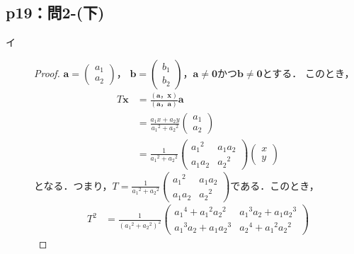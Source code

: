 \documentclass[uplatex,dvipdfmx,a4paper,10pt,fleqn]{jsarticle}
\begin{document}
\subsection*{p19：問2-(下)}
\begin{leftbar}
\begin{description}
    \item[イ] 
    \begin{proof}
    $\bm{a}=
        \begin{pmatrix}
            a_1 \\
            a_2
        \end{pmatrix}
    $，
    $\bm{b}=
        \begin{pmatrix}
            b_1 \\
            b_2
        \end{pmatrix}
    $，$\bm{a} \ne \bm{0}$かつ$\bm{b} \ne \bm{0}$とする．
    このとき，
    \begin{align*}
        T \bm{x} &=\frac{(\bm{a}，\bm{x})}{(\bm{a}，\bm{a})} \bm{a} \\
        & = \frac{a_1 x + a_2 y}{{a_1}^2+{a_2}^2} 
        \begin{pmatrix}
            a_1 \\
            a_2
        \end{pmatrix}
        \\
        & =
        \frac{1}{{a_1}^2+{a_2}^2}
        \begin{pmatrix}
            {a_1}^2 & a_1 a_2 \\
            a_1 a_2 & {a_2}^2
        \end{pmatrix}
        \begin{pmatrix}
            x \\
            y
        \end{pmatrix}
    \end{align*}
    となる．つまり，$T=\frac{1}{{a_1}^2+{a_2}^2}
    \begin{pmatrix}
        {a_1}^2 & a_1 a_2 \\
        a_1 a_2 & {a_2}^2
    \end{pmatrix}
    $である．このとき，
    \begin{align*}
        T^2 &= \frac{1}{({a_1}^2+{a_2}^2)^2}
        \begin{pmatrix}
            {a_1}^4 + {a_1}^2 {a_2}^2 & {a_1}^3 a_2 + a_1 {a_2}^3 \\
            {a_1}^3 a_2 + a_1 {a_2}^3 & {a_2}^4 + {a_1}^2 {a_2}^2

\end{pmatrix}
\end{align*}
\end{proof}
\end{description}
\end{leftbar}
\end{document}
